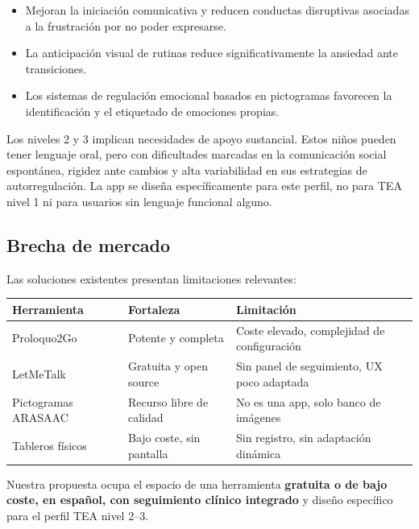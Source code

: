 \documentclass[12pt, a4paper]{article}
\begin{document}
\begin{itemize}
  \item Mejoran la iniciación comunicativa y reducen conductas disruptivas asociadas a la frustración por no poder expresarse.
  \item La anticipación visual de rutinas reduce significativamente la ansiedad ante transiciones.
  \item Los sistemas de regulación emocional basados en pictogramas favorecen la identificación y el etiquetado de emociones propias.
\end{itemize}

\begin{nota}
Los niveles 2 y 3 implican necesidades de apoyo sustancial. Estos niños pueden tener lenguaje oral, pero con dificultades marcadas en la comunicación social espontánea, rigidez ante cambios y alta variabilidad en sus estrategias de autorregulación. La app se diseña específicamente para este perfil, no para TEA nivel 1 ni para usuarios sin lenguaje funcional alguno.
\end{nota}

\subsection{Brecha de mercado}

Las soluciones existentes presentan limitaciones relevantes:

\begin{tabular}{L{4cm} L{5cm} L{5cm}}
\toprule
\textbf{Herramienta} & \textbf{Fortaleza} & \textbf{Limitación} \\
\midrule
Proloquo2Go & Potente y completa & Coste elevado, complejidad de configuración \\
LetMeTalk & Gratuita y open source & Sin panel de seguimiento, UX poco adaptada \\
Pictogramas ARASAAC & Recurso libre de calidad & No es una app, solo banco de imágenes \\
Tableros físicos & Bajo coste, sin pantalla & Sin registro, sin adaptación dinámica \\
\bottomrule
\end{tabular}

\vspace{6pt}
Nuestra propuesta ocupa el espacio de una herramienta \textbf{gratuita o de bajo coste, en español, con seguimiento clínico integrado} y diseño específico para el perfil TEA nivel 2--3.

\end{document}
